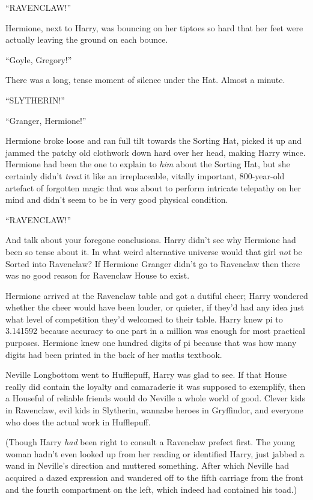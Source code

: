 ``RAVENCLAW!''

Hermione, next to Harry, was bouncing on her tiptoes so hard that her feet were actually leaving the ground on each bounce.

``Goyle, Gregory!''

There was a long, tense moment of silence under the Hat. Almost a minute.

``SLYTHERIN!''

``Granger, Hermione!''

Hermione broke loose and ran full tilt towards the Sorting Hat, picked it up and jammed the patchy old clothwork down hard over her head, making Harry wince. Hermione had been the one to explain to \emph{him} about the Sorting Hat, but she certainly didn't \emph{treat} it like an irreplaceable, vitally important, 800-year-old artefact of forgotten magic that was about to perform intricate telepathy on her mind and didn't seem to be in very good physical condition.

``RAVENCLAW!''

And talk about your foregone conclusions. Harry didn't see why Hermione had been so tense about it. In what weird alternative universe would that girl \emph{not} be Sorted into Ravenclaw? If Hermione Granger didn't go to Ravenclaw then there was no good reason for Ravenclaw House to exist.

Hermione arrived at the Ravenclaw table and got a dutiful cheer; Harry wondered whether the cheer would have been louder, or quieter, if they'd had any idea just what level of competition they'd welcomed to their table. Harry knew pi to 3.141592 because accuracy to one part in a million was enough for most practical purposes. Hermione knew one hundred digits of pi because that was how many digits had been printed in the back of her maths textbook.

Neville Longbottom went to Hufflepuff, Harry was glad to see. If that House really did contain the loyalty and camaraderie it was supposed to exemplify, then a Houseful of reliable friends would do Neville a whole world of good. Clever kids in Ravenclaw, evil kids in Slytherin, wannabe heroes in Gryffindor, and everyone who does the actual work in Hufflepuff.

(Though Harry \emph{had} been right to consult a Ravenclaw prefect first. The young woman hadn't even looked up from her reading or identified Harry, just jabbed a wand in Neville's direction and muttered something. After which Neville had acquired a dazed expression and wandered off to the fifth carriage from the front and the fourth compartment on the left, which indeed had contained his toad.)

